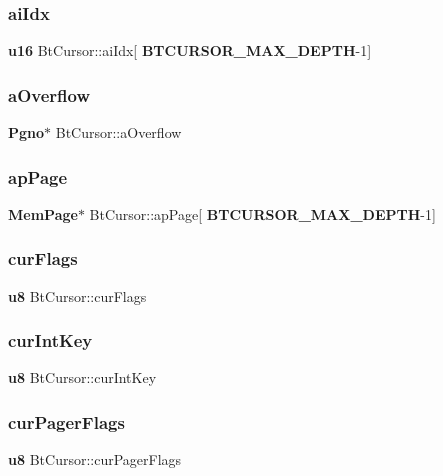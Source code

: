 \subsubsection{aiIdx}
{\footnotesize\ttfamily \textbf{ u16} Bt\+Cursor\+::ai\+Idx[\textbf{ B\+T\+C\+U\+R\+S\+O\+R\+\_\+\+M\+A\+X\+\_\+\+D\+E\+P\+TH}-\/1]}

\mbox{\label{struct_bt_cursor_ae2dbcc15e63d349774a7ad6caef4d096}} 
\subsubsection{aOverflow}
{\footnotesize\ttfamily \textbf{ Pgno}$\ast$ Bt\+Cursor\+::a\+Overflow}

\mbox{\label{struct_bt_cursor_ac4e6357050287ac58088aab7ec5f0719}} 
\subsubsection{apPage}
{\footnotesize\ttfamily \textbf{ Mem\+Page}$\ast$ Bt\+Cursor\+::ap\+Page[\textbf{ B\+T\+C\+U\+R\+S\+O\+R\+\_\+\+M\+A\+X\+\_\+\+D\+E\+P\+TH}-\/1]}

\mbox{\label{struct_bt_cursor_ab120d81b3550eabce37f377cbdae8836}} 
\subsubsection{curFlags}
{\footnotesize\ttfamily \textbf{ u8} Bt\+Cursor\+::cur\+Flags}

\mbox{\label{struct_bt_cursor_a37db7ea50e0f355ea6a3d8d3213722c3}} 
\subsubsection{curIntKey}
{\footnotesize\ttfamily \textbf{ u8} Bt\+Cursor\+::cur\+Int\+Key}

\mbox{\label{struct_bt_cursor_aff2ef1cec10fbfc0c2d35277b5ee4432}} 
\subsubsection{curPagerFlags}
{\footnotesize\ttfamily \textbf{ u8} Bt\+Cursor\+::cur\+Pager\+Flags}

